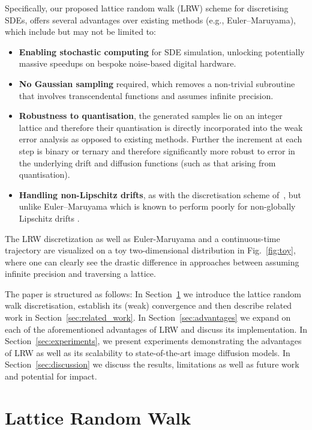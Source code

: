 \documentclass[pra,showpacs,amsmath,amssymb,amsfonts,lengthcheck,longbibliography,onecolumn]{revtex4-2}
\begin{document}
Specifically, our proposed lattice random walk (LRW) scheme for discretising SDEs, offers several advantages over existing methods (e.g., Euler–Maruyama), which include but may not be limited to:
\begin{itemize}
    \item \textbf{Enabling stochastic computing} for SDE simulation, unlocking potentially massive speedups on bespoke noise-based digital hardware.
    \item \textbf{No Gaussian sampling} required, which removes a non-trivial subroutine that involves transcendental functions and assumes infinite precision.
    \item \textbf{Robustness to quantisation}, the generated samples lie on an integer lattice and therefore their quantisation is directly incorporated into the weak error analysis as opposed to existing methods.
    Further the increment at each step is binary or ternary and therefore significantly more robust to error in the underlying drift and diffusion functions (such as that arising from quantisation).
    \item \textbf{Handling non-Lipschitz drifts}, as with the discretisation scheme of~\cite{iguchi2024skew}, but unlike Euler–Maruyama which is known to perform poorly for non-globally Lipschitz drifts \cite{higham2002strong}.
\end{itemize}
The LRW discretization as well as Euler-Maruyama and a continuous-time trajectory are visualized on a toy two-dimensional distribution in Fig.~\ref{fig:toy}, where one can clearly see the drastic difference in approaches between assuming infinite precision and traversing a lattice.

The paper is structured as follows: In Section~\ref{sec:lrw} we introduce the lattice
random walk discretisation, establish its (weak) convergence
and then describe related work in Section~\ref{sec:related_work}. In Section~\ref{sec:advantages} we expand
on each of the aforementioned advantages of LRW and discuss its implementation. In
Section~\ref{sec:experiments}, we present experiments demonstrating the advantages of LRW
as well as its scalability to state-of-the-art image diffusion models. In
Section~\ref{sec:discussion} we discuss the results, limitations as well as
future work and potential for impact.


\section{Lattice Random Walk}\label{sec:lrw}
\end{document}
